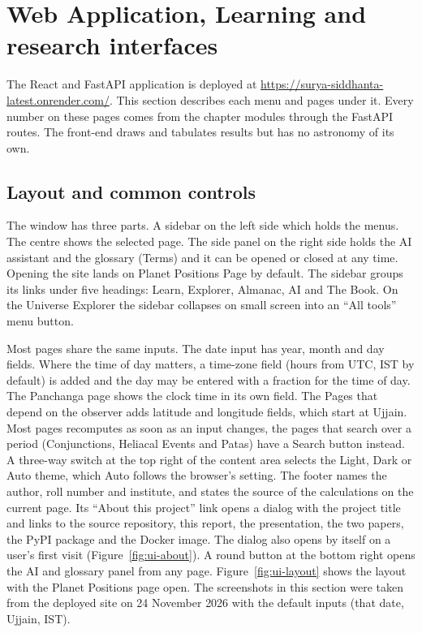 \documentclass[12pt,a4paper,oneside]{report}
\begin{document}
\section{Web Application, Learning and research interfaces}
\label{sec:learning-interfaces}

The React\cite{react} and FastAPI \cite{fastapi} application is deployed at
\url{https://surya-siddhanta-latest.onrender.com/}. This section
describes each menu and pages under it. Every number on these
pages comes from the chapter modules through the FastAPI routes. The
front-end draws and tabulates results but has no astronomy of its own.

\subsection{Layout and common controls}

The window has three parts. A sidebar on the left side which holds the menus. The
centre shows the selected page. The side panel on the right side holds the AI
assistant and the glossary (Terms) and it can be opened or closed at any time.
Opening the site lands on Planet Positions Page by default. The sidebar groups its
links under five headings: Learn, Explorer, Almanac, AI and The Book.
On the Universe Explorer the sidebar collapses on small screen into an
``All tools'' menu button.

Most pages share the same inputs. The date input has year, month and
day fields. Where the time of day matters, a time-zone field (hours
from UTC, IST by default) is added and the day may be entered with a
fraction for the time of day. The Panchanga page shows the clock time
in its own field. The Pages that depend on the observer adds latitude and
longitude fields, which start at Ujjain. Most pages recomputes as soon
as an input changes, the pages that search over a period (Conjunctions,
Heliacal Events and Patas) have a Search button instead. A three-way switch at the top right of the
content area selects the Light, Dark or Auto theme, which Auto follows the
browser's setting. The footer names the author, roll number and
institute, and states the source of the calculations on the current
page. Its ``About this project'' link opens a dialog with the project
title and links to the source repository, this report, the
presentation, the two papers, the PyPI package and the Docker image.
The dialog also opens by itself on a user's first visit
(Figure~\ref{fig:ui-about}). A round button at the bottom right opens
the AI and glossary panel from any page. Figure~\ref{fig:ui-layout}
shows the layout with the Planet Positions page open. The screenshots
in this section were taken from the deployed site on 24 November 2026
with the default inputs (that date, Ujjain, IST).
\end{document}
